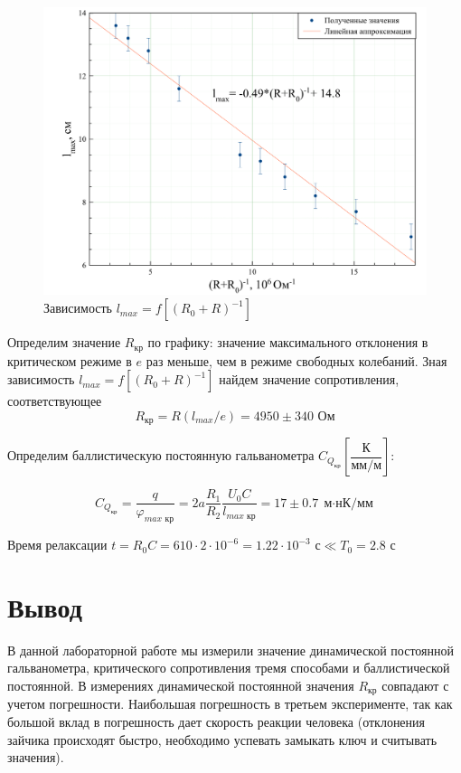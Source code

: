 \documentclass[a4paper, 12pt]{article}
\begin{document}
\begin {figure}[H]
	\begin{center}
		\includegraphics[width = 0.8 \textwidth]{GraphC}
		\caption{Зависимость $l_{max} = f[(R_0+R)^{-1}]$}
	\end{center}
\end {figure}

Определим значение $R_\text{кр}$ по графику: значение максимального отклонения в критическом режиме в $e$ раз меньше, чем в режиме свободных колебаний. Зная зависимость $l_{max} = f[(R_0+R)^{-1}]$ найдем значение сопротивления, соответствующее 
$$R_\text{кр} = R(l_{max}/e) = 4950 \pm 340 \text{ Ом}$$

Определим баллистическую постоянную гальванометра $C_{Q_\text{кр}} \left[\dfrac{\text{К}}{\text{мм/м}} \right]$:

$$C_{Q_\text{кр}} = \dfrac{q}{\varphi_{max \text{ кр}}} = 2a \dfrac{R_1}{R_2} \dfrac{U_0C}{l_{max \text{ кр}}} = 17 \pm 0.7 \; \text{м$\cdot$нК/мм}$$

Время релаксации $t = R_0C = 610 \cdot 2 \cdot 10^{-6} = 1.22 \cdot 10^{-3} \text{ с} \ll T_0 = 2.8 \text{ с}$

\section{Вывод}

В данной лабораторной работе мы измерили значение динамической постоянной гальванометра, критического сопротивления тремя способами и баллистической постоянной. В измерениях динамической постоянной значения $R_\text{кр}$ совпадают с учетом погрешности. Наибольшая погрешность в третьем эксперименте, так как большой вклад в погрешность дает скорость реакции человека (отклонения зайчика происходят быстро, необходимо успевать замыкать ключ и считывать значения).
\end{document}
